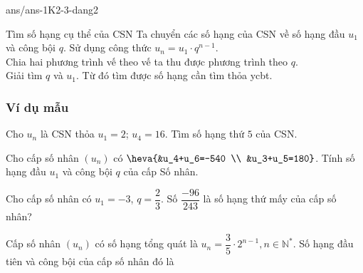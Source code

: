 \begin{indapan}{10}
	{ans/ans-1K2-3-dang2}
\end{indapan}
\begin{dang}{Tìm số hạng cụ thể của CSN}
	Ta chuyển các số hạng của CSN về số hạng đầu $u_1$ và công bội $q$. Sử dụng công thức $u_n=u_1\cdot q^{n-1}$. \\
	Chia hai phương trình vế theo vế ta thu được phương trình theo $q$. \\
	Giải tìm $q$ và $u_1$. Từ đó tìm được số hạng cần tìm thỏa ycbt.
\end{dang}
\subsubsection{Ví dụ mẫu}
\begin{vd}[NB]%
	Cho $u_n$ là CSN thỏa $u_1=2$; $u_4=16$. Tìm số hạng thứ $5$ của CSN.
\end{vd}
\begin{vd}[TH]%
	Cho cấp số nhân $(u_n)$ có $\heva{&u_4+u_6=-540 \\ &u_3+u_5=180}$. Tính số hạng đầu $u_1$ và công bội $q$ của cấp Số nhân.
\end{vd}
\begin{vd}[TH]%
	Cho cấp số nhân có $u_1=-3$, $q=\dfrac{2}{3}$. Số $\dfrac{-96}{243}$ là số hạng thứ mấy của cấp số nhân?
\end{vd}
\begin{vd}[TH]%
	Cấp số nhân $\left(u_{n}\right)$ có số hạng tổng quát là $u_n=\dfrac{3}{5} \cdot 2^{n-1}, n \in \mathbb{N}^*$. Số hạng đầu tiên và công bội của cấp số nhân đó là
\end{vd}
